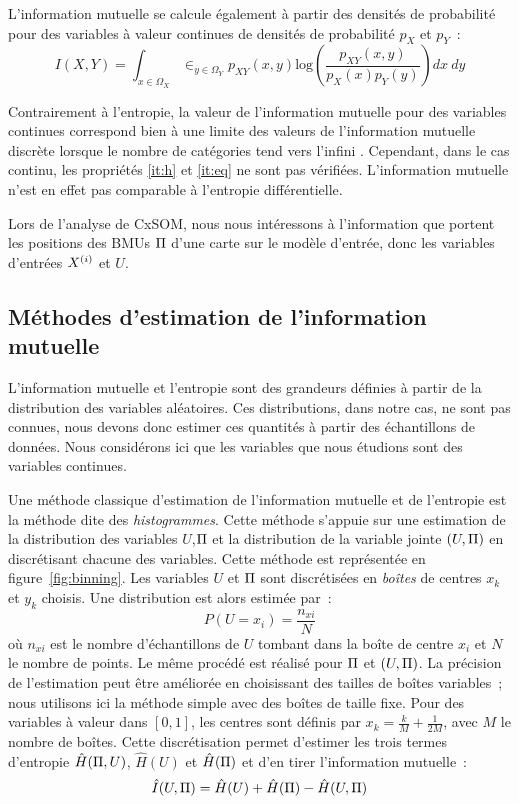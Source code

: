 \documentclass[../main]{subfiles}
\begin{document}
L'information mutuelle se calcule également à partir des densités de probabilité pour des variables à valeur continues de densités de probabilité $p_X$ et $p_Y$~:
\begin{equation}
    I(X,Y) = \int_{x \in \Omega_X}\in _ {y \in \Omega_Y }{p_{XY}(x,y)\textrm{log}(\frac{p_{XY}(x,y)}{p_X(x)p_Y(y)})dx \: dy}
\end{equation}

Contrairement à l'entropie, la valeur de l'information mutuelle pour des variables continues correspond bien à une limite des valeurs de l'information mutuelle discrète lorsque le nombre de catégories tend vers l'infini \cite{Cover2005ElementsOI}.
Cependant, dans le cas continu, les propriétés \ref{it:h} et \ref{it:eq} ne sont pas vérifiées. L'information mutuelle n'est en effet pas comparable à l'entropie différentielle.

Lors de l'analyse de CxSOM, nous nous intéressons à l'information que portent les positions des BMUs $\Pi$ d'une carte sur le modèle d'entrée, donc les variables d'entrées $X^{({i})}$ et $U$.

\subsection{Méthodes d'estimation de l'information mutuelle}

L'information mutuelle et l'entropie sont des grandeurs définies à partir de la distribution des variables aléatoires. Ces distributions, dans notre cas, ne sont pas connues, nous devons donc estimer ces quantités à partir des échantillons de données. Nous considérons ici que les variables que nous étudions sont des variables continues.

Une méthode classique d'estimation de l'information mutuelle et de l'entropie est la méthode dite des \emph{histogrammes}.
Cette méthode s'appuie sur une estimation de la distribution des variables $U$,$\Pi$ et la distribution de la variable jointe $(U,\Pi)$ en discrétisant chacune des variables.
Cette méthode est représentée en figure~\ref{fig:binning}. Les variables $U$ et $\Pi$ sont discrétisées en \emph{boîtes} de centres $x_k$ et $y_k$ choisis.
Une distribution est alors estimée par~: 
$$P(U = x_i) = \frac{n_{xi}}{N} $$ où $n_{xi}$ est le nombre d'échantillons de $U$ tombant dans la boîte de centre $x_i$ et $N$ le nombre de points. Le même procédé est réalisé pour $\Pi$ et $(U,\Pi)$. La précision de l'estimation peut être améliorée en choisissant des tailles de boîtes variables~; nous utilisons ici la méthode simple avec des boîtes de taille fixe.
Pour des variables à valeur dans $[0,1]$, les centres sont définis par $x_k = \frac{k}{M}+\frac{1}{2M}$, avec $M$ le nombre de boîtes.
Cette discrétisation permet d'estimer les trois termes d'entropie $\hat{H}(\Pi,U)$, $\hat{H}(U)$ et $\hat{H}(\Pi)$ et d'en tirer l'information mutuelle~:
\begin{equation}
    \hat{I}(U,\Pi) = \hat{H}(U) + \hat{H}(\Pi) - \hat{H}(U,\Pi)
   \end{equation}
\end{document}
